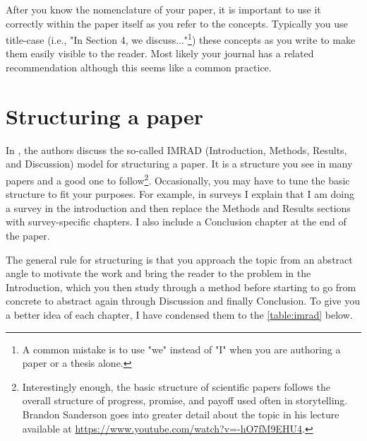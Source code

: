 After you know the nomenclature of your paper, it is important to use it correctly within the paper itself as you refer to the concepts.
Typically you use title-case (i.e., "In Section 4, we discuss..."\footnote{A common mistake is to use "we" instead of "I" when you are authoring a paper or a thesis alone.}) these concepts as you write to make them easily visible to the reader.
Most likely your journal has a related recommendation although this seems like a common practice.

\section{Structuring a paper}

In \citet{ecarnot2015writing}, the authors discuss the so-called IMRAD (Introduction, Methods, Results, and Discussion) model for structuring a paper.
It is a structure you see in many papers and a good one to follow\footnote{Interestingly enough, the basic structure of scientific papers follows the overall structure of progress, promise, and payoff used often in storytelling. Brandon Sanderson goes into greater detail about the topic in his lecture available at \url{https://www.youtube.com/watch?v=-hO7fM9EHU4}.}.
Occasionally, you may have to tune the basic structure to fit your purposes.
For example, in surveys I explain that I am doing a survey in the introduction and then replace the Methods and Results sections with survey-specific chapters.
I also include a Conclusion chapter at the end of the paper.

The general rule for structuring is that you approach the topic from an abstract angle to motivate the work and bring the reader to the problem in the Introduction, which you then study through a method before starting to go from concrete to abstract again through Discussion and finally Conclusion.
To give you a better idea of each chapter, I have condensed them to the \autoref{table:imrad} below.

